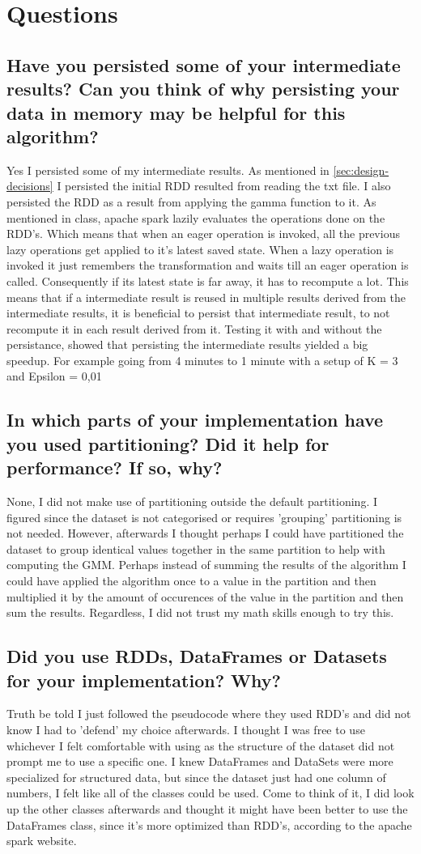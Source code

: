 \documentclass{article}
\begin{document}
\section{Questions}
\subsection{Have you persisted some of your intermediate results? Can you think of why persisting
	your data in memory may be helpful for this algorithm?}
Yes I persisted some of my intermediate results.
As mentioned in \ref{sec:design-decisions} I persisted the initial RDD resulted from reading the txt file.
I also persisted the RDD as a result from applying the gamma function to it.
As mentioned in class, apache spark lazily evaluates the operations done on the RDD's.
Which means that when an eager operation is invoked, all the previous lazy operations get applied to it's latest saved state.
When a lazy operation is invoked it just remembers the transformation and waits till an eager operation is called.
Consequently if its latest state is far away, it has to recompute a lot. This means that if a intermediate result is reused in multiple results derived from the intermediate results, it is beneficial to persist that intermediate result, to not recompute it in each result derived from it. Testing it with and without the persistance, showed that persisting the intermediate results yielded a big speedup. For example going from 4 minutes to 1 minute with a setup of K = 3 and Epsilon = 0,01
\subsection{
	In which parts of your implementation have you used partitioning? Did it help for
	performance? If so, why?
}
None, I did not make use of partitioning outside the default partitioning.
I figured since the dataset is not categorised or requires 'grouping' partitioning is not needed.
However, afterwards I thought perhaps I could have partitioned the dataset to group identical values together in the same partition to help with computing the GMM.
Perhaps instead of summing the results of the algorithm I could have applied the algorithm once to a value in the partition and then multiplied it by the amount of occurences of the value in the partition and then sum the results. Regardless, I did not trust my math skills enough to try this.
\subsection{
	Did you use RDDs, DataFrames or Datasets for your implementation? Why?
}
Truth be told I just followed the pseudocode where they used RDD's and did not know I had to 'defend' my choice afterwards. I thought I was free to use whichever I felt comfortable with using as the structure of the dataset did not prompt me to use a specific one.
I knew DataFrames and DataSets were more specialized for structured data, but since the dataset just had one column of numbers, I felt like all of the classes could be used.
Come to think of it, I did look up the other classes afterwards and thought it might have been better to use the DataFrames class, since it's more optimized than RDD's, according to the apache spark website.
\end{document}

